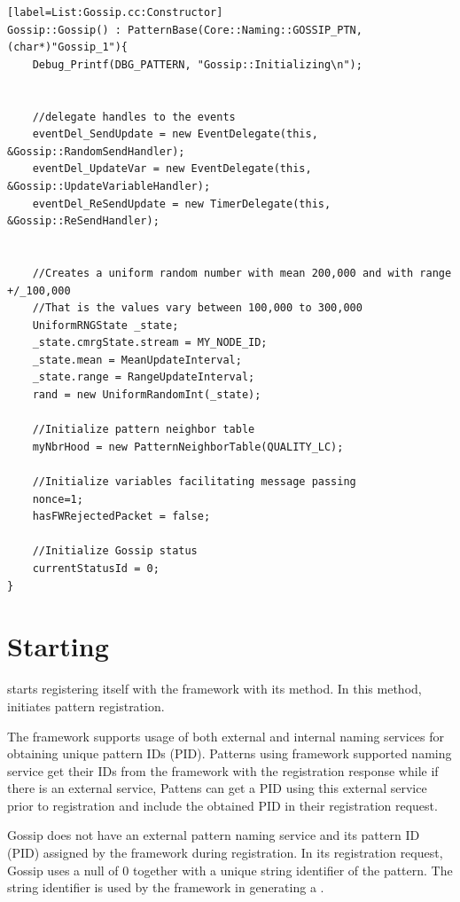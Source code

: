 \begin{lstlisting}[style=boralargefile][label=List:Gossip.cc:Constructor]
Gossip::Gossip() : PatternBase(Core::Naming::GOSSIP_PTN, (char*)"Gossip_1"){
	Debug_Printf(DBG_PATTERN, "Gossip::Initializing\n");


	//delegate handles to the events
	eventDel_SendUpdate = new EventDelegate(this, &Gossip::RandomSendHandler);
	eventDel_UpdateVar = new EventDelegate(this, &Gossip::UpdateVariableHandler);
	eventDel_ReSendUpdate = new TimerDelegate(this, &Gossip::ReSendHandler);


	//Creates a uniform random number with mean 200,000 and with range +/_100,000
	//That is the values vary between 100,000 to 300,000
	UniformRNGState _state;
	_state.cmrgState.stream = MY_NODE_ID;
	_state.mean = MeanUpdateInterval;
	_state.range = RangeUpdateInterval;
	rand = new UniformRandomInt(_state);

	//Initialize pattern neighbor table
	myNbrHood = new PatternNeighborTable(QUALITY_LC);

	//Initialize variables facilitating message passing
	nonce=1;
	hasFWRejectedPacket = false;

	//Initialize Gossip status
	currentStatusId = 0;
}
\end{lstlisting}

\section {Starting} \label{sec:Starting}

 starts registering itself with the framework with its  method. 
In this method, 
initiates pattern registration. 

The framework supports usage of both external and internal naming services for obtaining unique pattern IDs (PID). 
Patterns using framework supported naming service get their IDs from the framework with the registration response while if there is an external service, Pattens can get a PID using this external service prior to registration and include the obtained PID in their registration request. 

Gossip does not have an external pattern naming service and its pattern ID (PID) assigned by the framework during registration. In its registration request, Gossip uses a null  of 0 together with a unique string identifier of the pattern. The string identifier is used by the framework in generating a . 

